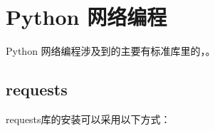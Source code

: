 \chapter{Python 网络编程}

Python 网络编程涉及到的\pythonmodule 主要有标准库里的，。

\section{requests}

requests库的安装可以采用以下方式：

